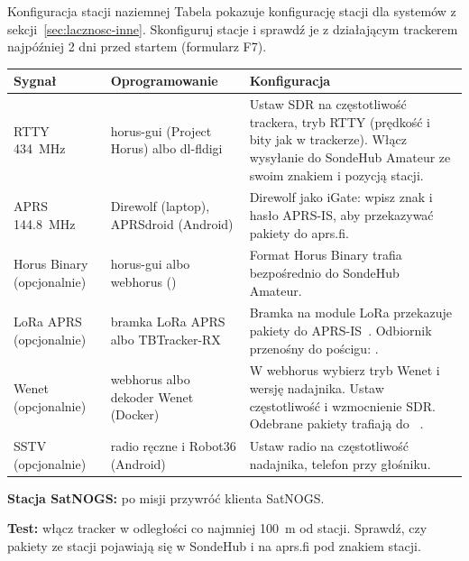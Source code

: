 \begin{sekcja}{Konfiguracja stacji naziemnej}\label{sec:konfiguracja-stacji}
Tabela pokazuje konfigurację stacji dla systemów z sekcji~\ref{sec:lacznosc-inne}. Skonfiguruj stacje i sprawdź je z działającym trackerem najpóźniej 2 dni przed startem (formularz F7).

\renewcommand{\arraystretch}{1.3}
\small
\begin{tabularx}{\linewidth}{@{}P{26mm}P{36mm}L@{}}
\toprule
\textbf{Sygnał} & \textbf{Oprogramowanie} & \textbf{Konfiguracja}\\\midrule
RTTY \SI{434}{MHz} & horus-gui (Project Horus) albo dl-fldigi & Ustaw SDR na częstotliwość trackera, tryb RTTY (prędkość i bity jak w trackerze). Włącz wysyłanie do SondeHub Amateur ze swoim znakiem i pozycją stacji.\\
APRS \SI{144.8}{MHz} & Direwolf (laptop), APRSdroid (Android) & Direwolf jako iGate: wpisz znak i hasło APRS-IS, aby przekazywać pakiety do aprs.fi.\\
Horus Binary (opcjonalnie) & horus-gui albo webhorus () & Format Horus Binary trafia bezpośrednio do SondeHub Amateur.\\
LoRa APRS (opcjonalnie) & bramka LoRa APRS albo TBTracker-RX & Bramka na module LoRa przekazuje pakiety do APRS-IS~\cite{loraaprs}. Odbiornik przenośny do pościgu: \cite{tbtracker}.\\
Wenet (opcjonalnie) & webhorus albo dekoder Wenet (Docker) & W webhorus wybierz tryb Wenet i wersję nadajnika. Ustaw częstotliwość i wzmocnienie SDR. Odebrane pakiety trafiają do ~\cite{wenet}.\\
SSTV (opcjonalnie) & radio ręczne i Robot36 (Android) & Ustaw radio na częstotliwość nadajnika, telefon przy głośniku.\\
\bottomrule
\end{tabularx}
\normalsize

\textbf{Stacja SatNOGS:} po misji przywróć klienta SatNOGS.

\textbf{Test:} włącz tracker w odległości co najmniej \SI{100}{m} od stacji. Sprawdź, czy pakiety ze stacji pojawiają się w SondeHub i na aprs.fi pod znakiem stacji.
\end{sekcja}

